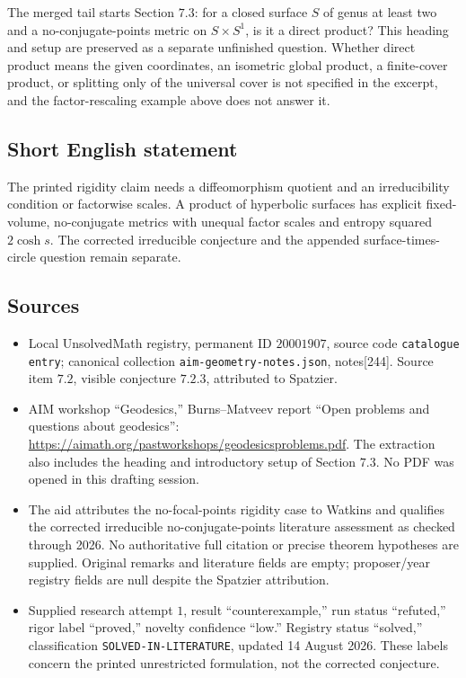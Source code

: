 \documentclass[11pt]{article}
\begin{document}
The merged tail starts Section \(7.3\): for a closed surface \(S\) of genus at least two and a no-conjugate-points metric on \(S\times S^1\), is it a direct product? This heading and setup are preserved as a separate unfinished question. Whether direct product means the given coordinates, an isometric global product, a finite-cover product, or splitting only of the universal cover is not specified in the excerpt, and the factor-rescaling example above does not answer it.
\subsection{Short English statement}
The printed rigidity claim needs a diffeomorphism quotient and an irreducibility condition or factorwise scales. A product of hyperbolic surfaces has explicit fixed-volume, no-conjugate metrics with unequal factor scales and entropy squared \(2\cosh s\). The corrected irreducible conjecture and the appended surface-times-circle question remain separate.
\subsection{Sources}
\begin{itemize}
\item Local UnsolvedMath registry, permanent ID \(20001907\), source code \texttt{catalogue entry}; canonical collection \texttt{aim-geometry-notes.json}, notes[244]. Source item \(7.2\), visible conjecture \(7.2.3\), attributed to Spatzier.
\item AIM workshop ``Geodesics,'' Burns--Matveev report ``Open problems and questions about geodesics'': \url{https://aimath.org/pastworkshops/geodesicsproblems.pdf}. The extraction also includes the heading and introductory setup of Section \(7.3\). No PDF was opened in this drafting session.
\item The aid attributes the no-focal-points rigidity case to Watkins and qualifies the corrected irreducible no-conjugate-points literature assessment as checked through 2026. No authoritative full citation or precise theorem hypotheses are supplied. Original remarks and literature fields are empty; proposer/year registry fields are null despite the Spatzier attribution.
\item Supplied research attempt \(1\), result ``counterexample,'' run status ``refuted,'' rigor label ``proved,'' novelty confidence ``low.'' Registry status ``solved,'' classification \texttt{SOLVED-IN-LITERATURE}, updated 14 August 2026. These labels concern the printed unrestricted formulation, not the corrected conjecture.
\end{itemize}
\end{document}
